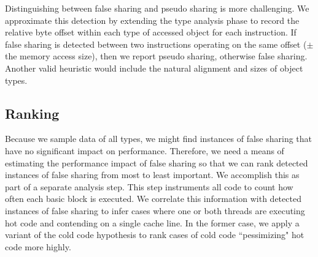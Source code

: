 \documentclass{sig-alternate}
\newcommand{\TextToolname}{CatcheScan}
\newcommand{\Toolname}{\textsc{\TextToolname{}}}
\begin{document}
Distinguishing between false sharing and pseudo sharing is more challenging. We approximate this detection by extending
the type analysis phase to record the relative byte offset within each type of accessed object for each instruction. If false
sharing is detected between two instructions operating on the same offset ($\pm$ the memory access size), then we report
pseudo sharing, otherwise false sharing. Another valid heuristic would include the natural alignment and sizes of object
types.



\subsection{Ranking}\label{sec:ranking}

Because we sample data of all types, we might find instances of false sharing that have no significant impact on performance.
Therefore, we need a means of estimating the performance impact of false sharing so that we can rank detected instances of
false sharing from most to least important. We accomplish this as part of a separate analysis step. This step
instruments all code to count how often each basic block is executed. We correlate this information with detected
instances of false sharing to infer cases where one or both threads are executing hot code and contending on a single
cache line. In the former case, we apply a variant of the cold code hypothesis \cite{LiteRace} to rank cases of cold
code ``pessimizing" hot code more highly.

\end{document}

